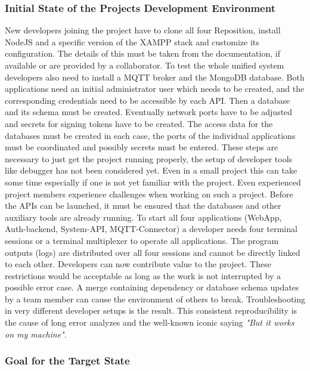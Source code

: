 \documentclass[12pt, a4paper]{article}
\begin{document}
        \subsubsection{Initial State of the Projects Development Environment}
        New developers joining the project have to clone all four Reposition, install NodeJS and a specific version of the \ac{XAMPP} stack and customize its configuration. The details of this must be taken from the documentation, if available or are provided by a collaborator. To test the whole unified system developers also need to install a MQTT broker and the MongoDB database. Both applications need an initial administrator user which needs to be created, and the corresponding credentials need to be accessible by each \ac{API}. Then a database and its schema must be created. Eventually network ports have to be adjusted and secrets for signing tokens have to be created.
        The access data for the databases must be created in each case, the ports of the individual applications must be coordinated and possibly secrets must be entered. These steps are necessary to just get the project running properly, the setup of developer tools like debugger has not been considered yet. Even in a small project this can take some time especially if one is not yet familiar with the project.\newline
        Even experienced project members experience challenges when working on such a project. Before the APIs can be launched, it must be ensured that the databases and other auxiliary tools are already running. To start all four applications (WebApp, Auth-backend, System-API, MQTT-Connector) a developer needs four terminal sessions or a terminal multiplexer to operate all applications. The program outputs (logs) are distributed over all four sessions and cannot be directly linked to each other. Developers can now contribute value to the project. These restrictions would be acceptable as long as the work is not interrupted by a possible error case. A merge containing dependency or database schema updates by a team member can cause the environment of others to break. Troubleshooting in very different developer setups is the result. This consistent reproducibility is the cause of long error analyzes and the well-known iconic saying \textit{"But it works on my machine"}.
        
        \subsubsection{Goal for the Target State}\label{sssec::goal}
\end{document}
